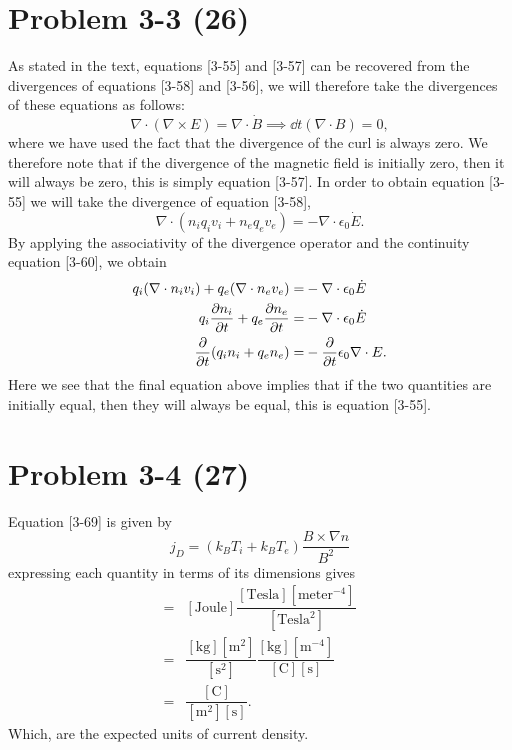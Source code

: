 \section*{Problem 3-3 (26)}
\label{sec:3-3}
As stated in the text, equations [3-55] and [3-57] can be recovered from the divergences of equations [3-58] and [3-56], we will therefore take the divergences of these equations as follows:
\begin{equation*}
	\nabla \cdot (\nabla \times E) = \nabla \cdot \dot{B} \implies \dd{ }{t}(\nabla \cdot B) = 0,
\end{equation*}
where we have used the fact that the divergence of the curl is always zero. We therefore note that if the divergence of the magnetic field is initially zero, then it will always be zero, this is simply equation [3-57]. In order to obtain equation [3-55] we will take the divergence of equation [3-58], 
\begin{equation*}
	\nabla \cdot (n_iq_iv_i + n_eq_ev_e) = - \nabla\cdot\epsilon_0\dot{E}.
\end{equation*}
By applying the associativity of the divergence operator and the continuity equation [3-60], we obtain
\begin{align*}
	q_i(\nabla \cdot n_iv_i) + q_e(\nabla \cdot n_ev_e)=& -\nabla\cdot\epsilon_0\dot{E}\\
	q_i\frac{\partial n_i}{\partial t} + q_e\frac{\partial n_e}{\partial t}=& -\nabla\cdot\epsilon_0\dot{E}\\
	\frac{\partial }{\partial t}(q_in_i + q_en_e) =& -\frac{\partial }{\partial t}\epsilon_0\nabla\cdot E.
\end{align*}
Here we see that the final equation above implies that if the two quantities are initially equal, then they will always be equal, this is equation [3-55].
\section*{Problem 3-4 (27)}
\label{sec:3-4}
Equation [3-69] is given by
\begin{equation*}
	j_D = \left(k_BT_i + k_BT_e\right)\dfrac{B\times\nabla n}{B^2}
\end{equation*}
expressing each quantity in terms of its dimensions gives
\begin{align*}
	[j_D] =& [\text{Joule}]\dfrac{[\text{Tesla}][\text{meter}^{-4}]}{[\text{Tesla}^2]}\\
		=& \dfrac{[\text{kg}][\text{m}^2]}{[\text{s}^2]} \dfrac{[\text{kg}][\text{m}^{-4}]}{[\text{C}][\text{s}]}\\
		=& \dfrac{[\text{C}]}{[\text{m}^2][\text{s}]}.
\end{align*}
Which, are the expected units of current density.

